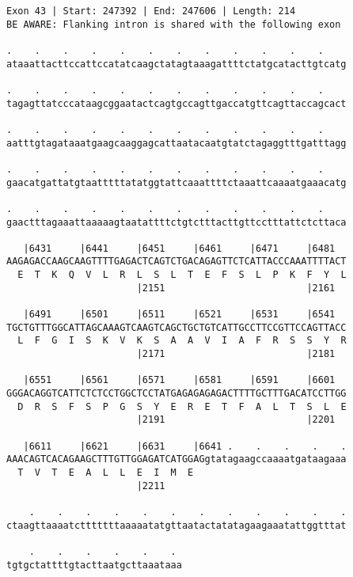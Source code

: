 \documentclass{article}
\begin{document}
\newpage
\begin{Verbatim}
Exon 43 | Start: 247392 | End: 247606 | Length: 214
BE AWARE: Flanking intron is shared with the following exon
 
.    .    .    .    .    .    .    .    .    .    .    .    
ataaattacttccattccatatcaagctatagtaaagattttctatgcatacttgtcatg
  
.    .    .    .    .    .    .    .    .    .    .    .    
tagagttatcccataagcggaatactcagtgccagttgaccatgttcagttaccagcact
  
.    .    .    .    .    .    .    .    .    .    .    .    
aatttgtagataaatgaagcaaggagcattaatacaatgtatctagaggtttgatttagg
  
.    .    .    .    .    .    .    .    .    .    .    .    
gaacatgattatgtaatttttatatggtattcaaattttctaaattcaaaatgaaacatg
  
.    .    .    .    .    .    .    .    .    .    .    .    
gaactttagaaattaaaaagtaatattttctgtctttacttgttcctttattctcttaca
  
   |6431     |6441     |6451     |6461     |6471     |6481  
AAGAGACCAAGCAAGTTTTGAGACTCAGTCTGACAGAGTTCTCATTACCCAAATTTTACT
  E  T  K  Q  V  L  R  L  S  L  T  E  F  S  L  P  K  F  Y  L
                       |2151                         |2161  
  
   |6491     |6501     |6511     |6521     |6531     |6541  
TGCTGTTTGGCATTAGCAAAGTCAAGTCAGCTGCTGTCATTGCCTTCCGTTCCAGTTACC
  L  F  G  I  S  K  V  K  S  A  A  V  I  A  F  R  S  S  Y  R
                       |2171                         |2181  
  
   |6551     |6561     |6571     |6581     |6591     |6601  
GGGACAGGTCATTCTCTCCTGGCTCCTATGAGAGAGAGACTTTTGCTTTGACATCCTTGG
  D  R  S  F  S  P  G  S  Y  E  R  E  T  F  A  L  T  S  L  E
                       |2191                         |2201  
  
   |6611     |6621     |6631     |6641 .    .    .    .    .
AAACAGTCACAGAAGCTTTGTTGGAGATCATGGAGgtatagaagccaaaatgataagaaa
  T  V  T  E  A  L  L  E  I  M  E                           
                       |2211                                
  
    .    .    .    .    .    .    .    .    .    .    .    .
ctaagttaaaatctttttttaaaaatatgttaatactatatagaagaaatattggtttat
  
    .    .    .    .    .    . 
tgtgctattttgtacttaatgcttaaataaa
\end{Verbatim}
\newpage
\end{document}
